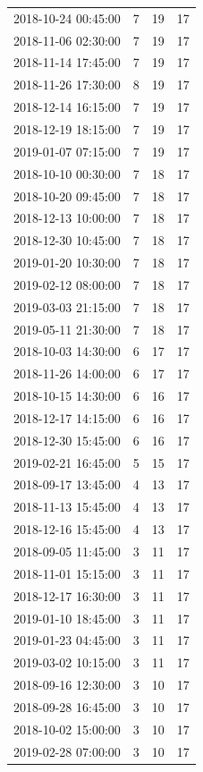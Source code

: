 \begin{tabular}{lrrr}
2018-10-24 00:45:00 & 7 & 19 & 17 \\
2018-11-06 02:30:00 & 7 & 19 & 17 \\
2018-11-14 17:45:00 & 7 & 19 & 17 \\
2018-11-26 17:30:00 & 8 & 19 & 17 \\
2018-12-14 16:15:00 & 7 & 19 & 17 \\
2018-12-19 18:15:00 & 7 & 19 & 17 \\
2019-01-07 07:15:00 & 7 & 19 & 17 \\
2018-10-10 00:30:00 & 7 & 18 & 17 \\
2018-10-20 09:45:00 & 7 & 18 & 17 \\
2018-12-13 10:00:00 & 7 & 18 & 17 \\
2018-12-30 10:45:00 & 7 & 18 & 17 \\
2019-01-20 10:30:00 & 7 & 18 & 17 \\
2019-02-12 08:00:00 & 7 & 18 & 17 \\
2019-03-03 21:15:00 & 7 & 18 & 17 \\
2019-05-11 21:30:00 & 7 & 18 & 17 \\
2018-10-03 14:30:00 & 6 & 17 & 17 \\
2018-11-26 14:00:00 & 6 & 17 & 17 \\
2018-10-15 14:30:00 & 6 & 16 & 17 \\
2018-12-17 14:15:00 & 6 & 16 & 17 \\
2018-12-30 15:45:00 & 6 & 16 & 17 \\
2019-02-21 16:45:00 & 5 & 15 & 17 \\
2018-09-17 13:45:00 & 4 & 13 & 17 \\
2018-11-13 15:45:00 & 4 & 13 & 17 \\
2018-12-16 15:45:00 & 4 & 13 & 17 \\
2018-09-05 11:45:00 & 3 & 11 & 17 \\
2018-11-01 15:15:00 & 3 & 11 & 17 \\
2018-12-17 16:30:00 & 3 & 11 & 17 \\
2019-01-10 18:45:00 & 3 & 11 & 17 \\
2019-01-23 04:45:00 & 3 & 11 & 17 \\
2019-03-02 10:15:00 & 3 & 11 & 17 \\
2018-09-16 12:30:00 & 3 & 10 & 17 \\
2018-09-28 16:45:00 & 3 & 10 & 17 \\
2018-10-02 15:00:00 & 3 & 10 & 17 \\
2019-02-28 07:00:00 & 3 & 10 & 17 \\

\end{tabular}
